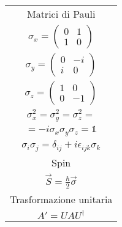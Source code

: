 \documentclass{article}
\newcommand{\id}{
    \mathds{1}
}
\begin{document}
\begin{minipage}{0.173\linewidth}
    \begin{tabular}{|c}
        Matrici di Pauli \\
        $\sigma_x = \left(\begin{matrix}
            0 & 1 \\
            1 & 0
        \end{matrix}\right) $ \\
        $\sigma_y = \left(\begin{matrix}
            0 & -i \\
            i & 0
        \end{matrix}\right) $ \\
        $\sigma_z = \left(\begin{matrix}
            1 & 0 \\
            0 & -1
        \end{matrix}\right) $ \\ 
        $\sigma_x^2 = \sigma_y^2 = \sigma_z^2 = $ \\
        $= -i\sigma_x\sigma_y\sigma_z = \id $ \\
        $\sigma_i\sigma_j = \delta_{ij} + i\epsilon_{ijk}\sigma_k $ \\ \hline
        Spin \\
        $\Vec{S} = \frac{\hbar}{2}\Vec{\sigma} $ \\ \hline
        Trasformazione unitaria \\
        $A' = UAU^\dagger $ \\ \hline
    \end{tabular}
\end{minipage}
\end{document}
